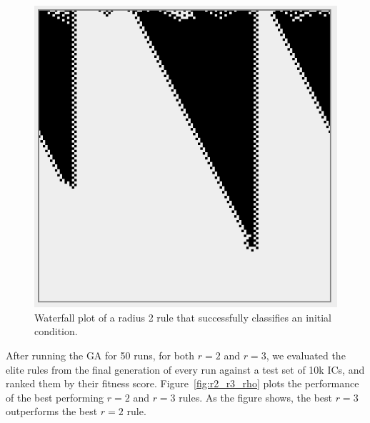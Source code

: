 \begin{figure}
\begin{center}
\includegraphics[width=0.8\linewidth]{figures/converging_radius2.png}
\caption{Waterfall plot of a radius 2 rule that successfully classifies an initial condition.}
\label{fig:waterfall_2}
\end{center}
\end{figure}

After running the GA for 50 runs, for both $r = 2$ and $r = 3$, we evaluated the elite rules from the final generation of every run against a test set of 10k ICs, and ranked them by their fitness score. Figure~\ref{fig:r2_r3_rho} plots the performance of the best performing $r = 2$ and $r = 3$ rules. As the figure shows, 
the best $r = 3$ outperforms the best $r = 2$ rule.

